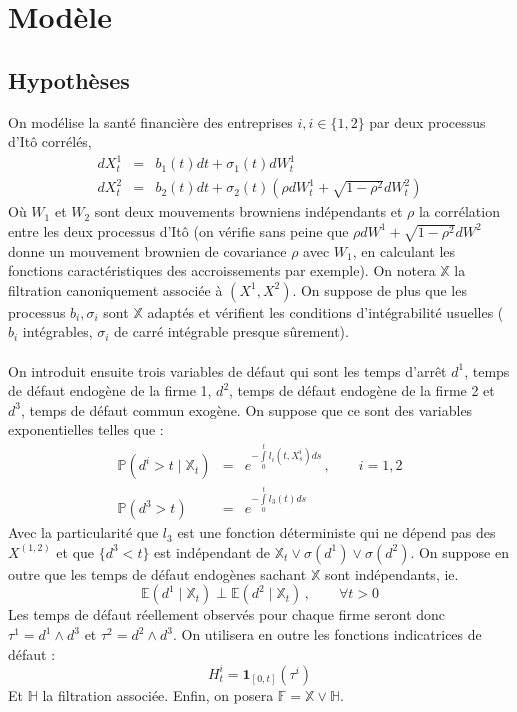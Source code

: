 \documentclass[a4paper]{article}
\begin{document}
\section{Modèle}
\subsection{Hypothèses}
On modélise la santé financière des entreprises $i, i \in \lbrace 1, 2 \rbrace$ par deux processus d'Itô corrélés, 
\begin{eqnarray}
dX^{1}_{t} &=& b_{1}(t)dt + \sigma_{1}(t)dW_{t}^{1} \\
dX^{2}_{t} &=& b_{2}(t)dt + \sigma_{2}(t)\left(\rho dW_{t}^{1} + \sqrt{1 - \rho^{2}} dW_{t}^{2}\right)
\end{eqnarray}
Où $W_{1}$ et $W_{2}$ sont deux mouvements browniens indépendants et $\rho$ la corrélation entre les deux processus d'Itô (on vérifie sans peine que $\rho dW^{1} + \sqrt{1 - \rho^{2}} dW^{2}$ donne un mouvement brownien de covariance $\rho$ avec $W_{1}$, en calculant les fonctions caractéristiques des accroissements par exemple). On notera $\mathbb{X}$ la filtration canoniquement associée à $(X^{1}, X^{2})$. On suppose de plus que les processus $b_{i}, \sigma_{i}$ sont $\mathbb{X}$ adaptés et vérifient les conditions d'intégrabilité usuelles ($b_{i}$ intégrables, $\sigma_{i}$ de carré intégrable presque sûrement). \\ \\
On introduit ensuite trois variables de défaut qui sont les temps d'arrêt $d^{1}$, temps de défaut endogène de la firme 1, $d^{2}$, temps de défaut endogène de la firme 2 et $d^{3}$, temps de défaut commun exogène. On suppose que ce sont des variables exponentielles telles que :
\begin{eqnarray}
\mathbb{P}\left( d^{i} > t \mid \mathbb{X}_{t} \right) &=& e ^{ -\int \limits_{0}^{t} l_{i} (t, X^{i}_{s})ds}\,,\qquad  i = 1, 2 \\
\mathbb{P}\left( d^{3} > t \right) &=&  e ^{ -\int \limits_{0}^{t} l_{3} (t)ds}
\end{eqnarray}
Avec la particularité que $l_{3}$ est une fonction déterministe qui ne dépend pas des $X^{(1,2)}$ et que $\lbrace d^{3} < t \rbrace$ est indépendant de $\mathbb{X}_{t} \vee \sigma(d^{1}) \vee \sigma(d^{2})$.
On suppose en outre que les temps de défaut endogènes sachant $\mathbb{X}$ sont indépendants, ie. 
\begin{equation*}
\mathbb{E} \left(d^1 \mid \mathbb{X}_t \right) \perp \mathbb{E} \left(d^2 \mid \mathbb{X}_t \right) \,,\qquad  \forall t > 0
\end{equation*}
Les temps de défaut réellement observés pour chaque firme seront donc $\tau^{1} = d^{1} \wedge d^{3}$ et  $\tau^{2} = d^{2} \wedge d^{3}$. On utilisera en outre les fonctions indicatrices de défaut :
\begin{equation*}
H^{i}_{t} = \mathbf{1}_{\left[0, t \right]} (\tau^{i})
\end{equation*}
Et $\mathbb{H}$ la filtration associée. Enfin, on posera $\mathbb{F} = \mathbb{X} \vee \mathbb{H}$. \\ \\
\end{document}

